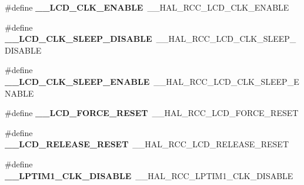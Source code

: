 \begin{DoxyCompactItemize}
\item 
\#define {\bfseries \+\_\+\+\_\+\+L\+C\+D\+\_\+\+C\+L\+K\+\_\+\+E\+N\+A\+B\+LE}~\+\_\+\+\_\+\+H\+A\+L\+\_\+\+R\+C\+C\+\_\+\+L\+C\+D\+\_\+\+C\+L\+K\+\_\+\+E\+N\+A\+B\+LE\hypertarget{group___h_a_l___r_c_c___aliased_ga5719fad27a70ec9e4512bb6fa8df1148}{}\label{group___h_a_l___r_c_c___aliased_ga5719fad27a70ec9e4512bb6fa8df1148}

\item 
\#define {\bfseries \+\_\+\+\_\+\+L\+C\+D\+\_\+\+C\+L\+K\+\_\+\+S\+L\+E\+E\+P\+\_\+\+D\+I\+S\+A\+B\+LE}~\+\_\+\+\_\+\+H\+A\+L\+\_\+\+R\+C\+C\+\_\+\+L\+C\+D\+\_\+\+C\+L\+K\+\_\+\+S\+L\+E\+E\+P\+\_\+\+D\+I\+S\+A\+B\+LE\hypertarget{group___h_a_l___r_c_c___aliased_ga16ae30997238082c03c1ba2dd42736d4}{}\label{group___h_a_l___r_c_c___aliased_ga16ae30997238082c03c1ba2dd42736d4}

\item 
\#define {\bfseries \+\_\+\+\_\+\+L\+C\+D\+\_\+\+C\+L\+K\+\_\+\+S\+L\+E\+E\+P\+\_\+\+E\+N\+A\+B\+LE}~\+\_\+\+\_\+\+H\+A\+L\+\_\+\+R\+C\+C\+\_\+\+L\+C\+D\+\_\+\+C\+L\+K\+\_\+\+S\+L\+E\+E\+P\+\_\+\+E\+N\+A\+B\+LE\hypertarget{group___h_a_l___r_c_c___aliased_ga4e3f32f549a41a5d9e4afb607bb61593}{}\label{group___h_a_l___r_c_c___aliased_ga4e3f32f549a41a5d9e4afb607bb61593}

\item 
\#define {\bfseries \+\_\+\+\_\+\+L\+C\+D\+\_\+\+F\+O\+R\+C\+E\+\_\+\+R\+E\+S\+ET}~\+\_\+\+\_\+\+H\+A\+L\+\_\+\+R\+C\+C\+\_\+\+L\+C\+D\+\_\+\+F\+O\+R\+C\+E\+\_\+\+R\+E\+S\+ET\hypertarget{group___h_a_l___r_c_c___aliased_gac78590e594ded3821d92f4a6fbd623bc}{}\label{group___h_a_l___r_c_c___aliased_gac78590e594ded3821d92f4a6fbd623bc}

\item 
\#define {\bfseries \+\_\+\+\_\+\+L\+C\+D\+\_\+\+R\+E\+L\+E\+A\+S\+E\+\_\+\+R\+E\+S\+ET}~\+\_\+\+\_\+\+H\+A\+L\+\_\+\+R\+C\+C\+\_\+\+L\+C\+D\+\_\+\+R\+E\+L\+E\+A\+S\+E\+\_\+\+R\+E\+S\+ET\hypertarget{group___h_a_l___r_c_c___aliased_ga93aaa79e2c11077ea32d96e01e64adeb}{}\label{group___h_a_l___r_c_c___aliased_ga93aaa79e2c11077ea32d96e01e64adeb}

\item 
\#define {\bfseries \+\_\+\+\_\+\+L\+P\+T\+I\+M1\+\_\+\+C\+L\+K\+\_\+\+D\+I\+S\+A\+B\+LE}~\+\_\+\+\_\+\+H\+A\+L\+\_\+\+R\+C\+C\+\_\+\+L\+P\+T\+I\+M1\+\_\+\+C\+L\+K\+\_\+\+D\+I\+S\+A\+B\+LE\hypertarget{group___h_a_l___r_c_c___aliased_ga8fe43bce0133b27a915fb7bac43c54dc}{}\label{group___h_a_l___r_c_c___aliased_ga8fe43bce0133b27a915fb7bac43c54dc}


\end{DoxyCompactItemize}
